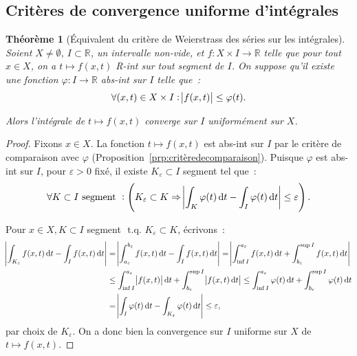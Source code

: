 \documentclass{report}
\newtheorem{thm}{Théorème}[chapter]
\theoremstyle{definition}
\theoremstyle{remark}
\numberwithin{equation}{section}
\newcommand{\R}{\mathbb R}
\newcommand{\tq}{\text{ t.q. }}
\begin{document}
		\subsection{Critères de convergence uniforme d'intégrales}
			\begin{thm}[Équivalent du critère de Weierstrass des séries sur les intégrales] Soient $X \neq \emptyset$, $I \subset \R$, un intervalle non-vide,
			et $f : X \times I \to \R$ telle que pour tout $x \in X$, on a $t \mapsto f(x, t)$ R-int sur tout segment de $I$. On suppose qu'il existe une
			fonction $\varphi : I \to \R$ abs-int sur $I$ telle que~:
			\begin{equation}
				\forall (x, t) \in X \times I : \abs {f(x, t)} \leq \varphi(t).
			\end{equation}

			Alors l'intégrale de $t \mapsto f(x, t)$ converge sur $I$ uniformément sur $X$.
			\end{thm}

			\begin{proof} Fixons $x \in X$. La fonction $t \mapsto f(x, t)$ est abs-int sur $I$ par le critère de comparaison avec $\varphi$
			(Proposition~\ref{prp:critèredecomparaison}). Puisque $\varphi$ est abs-int sur $I$, pour $\varepsilon > 0$ fixé, il existe $K_\varepsilon \subset I$
			segment tel que~:
			\begin{equation}
				\forall K \subset I \text{ segment } : \left(K_\varepsilon \subset K \Rightarrow \abs {\int_K \varphi(t)\dif t - \int_I \varphi(t)\dif t}
				\leq \varepsilon\right).
			\end{equation}

			Pour $x \in X, K \subset I$ segment $\tq K_\varepsilon \subset K$, écrivons~:
			\begin{align}
				\abs {\int_{K_\varepsilon} f(x, t)\dif t - \int_I f(x, t)\dif t} &= \abs {\int_{a_\varepsilon}^{b_\varepsilon} f(x, t)\dif t - \int_I f(x, t)\dif t}
					= \abs {\int_{\inf I}^{a_\varepsilon}f(x, t)\dif t + \int_{b_\varepsilon}^{\sup I}f(x, t)\dif t} \\
				&\leq \int_{\inf I}^{a_\varepsilon}\abs {f(x, t)}\dif t + \int_{b_\varepsilon}^{\sup I}\abs {f(x, t)\dif t}
					\leq \int_{\inf I}^{a_\varepsilon}\varphi(t)\dif t + \int_{b_\varepsilon}^{\sup I}\varphi(t)\dif t \\
				&= \abs {\int_I\varphi(t)\dif t - \int_{K_\varepsilon}\varphi(t)\dif t} \leq \varepsilon,
			\end{align}
			par choix de $K_\varepsilon$. On a donc bien la convergence sur $I$ uniforme sur $X$ de $t \mapsto f(x, t)$.
			\end{proof}
\end{document}
